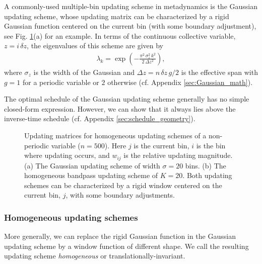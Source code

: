 \documentclass[reprint, superscriptaddress, floatfix]{revtex4-1}
\begin{document}
A commonly-used multiple-bin updating scheme in metadynamics
is the Gaussian updating scheme,
whose updating matrix can be characterized by
a rigid Gaussian function centered on the current bin
(with some boundary adjustment),
see Fig. \ref{fig:mat}(a) for an example.
%
In terms of the continuous collective variable, $z = i \, \delta z$,
the eigenvalues of this scheme are given by\cite{bussi2006}
\begin{align}
  \lambda_k
  =
  \exp\left(
        -
        \frac{ \pi^2 \, \sigma_z^2 \, k^2 }
             { 2 \, \Delta z^2 }
      \right)
  ,
  \label{eq:lambda_Gaussian}
\end{align}
where $\sigma_z$ is the width of the Gaussian
and $\Delta z = n \, \delta z \, g/2$
is the effective span
with $g = 1$ for a periodic variable or $2$ otherwise
(cf. Appendix \ref{sec:Gaussian_math}).

The optimal schedule of the Gaussian updating scheme
generally has no simple closed-form expression.
However, we can show that it always lies above
the inverse-time schedule
(cf. Appendix \ref{sec:schedule_geometry}).

\begin{figure}[h]\centering
  \caption{
    \label{fig:mat}
    Updating matrices for
    homogeneous updating schemes of
    a non-periodic variable ($n = 500$).
    Here $j$ is the current bin,
    $i$ is the bin where updating occurs,
    and $w_{ij}$ is the relative updating magnitude.
    (a) The Gaussian updating scheme of width $\sigma = 20$ bins.
    (b) The homogeneous bandpass updating scheme of $K = 20$.
    Both updating schemes
    can be characterized by a rigid window
    centered on the current bin, $j$,
    with some boundary adjustments.
  }
\end{figure}



\subsubsection{\label{sec:homo_scheme}
Homogeneous updating schemes}


More generally, we can replace the rigid Gaussian function
in the Gaussian updating scheme
by a window function of different shape.
%
We call the resulting updating scheme
\emph{homogeneous} or
translationally-invariant.
\end{document}
